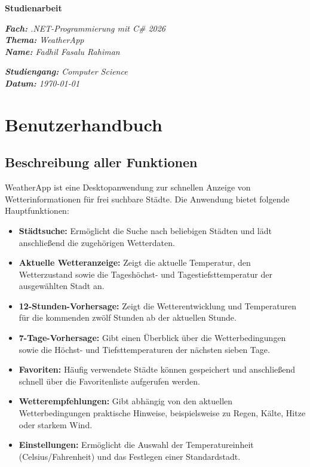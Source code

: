 \documentclass[12pt,a4paper]{article}
\begin{document}
\noindent
{\fontsize{24}{28}\selectfont\bfseries Studienarbeit} \\
\begin{minipage}[t]{0.5\textwidth}
  \vspace{8pt}
  {\itshape \textbf{Fach:} .NET-Programmierung mit C\# 2026} \\
  {\itshape \textbf{Thema:} WeatherApp} \\
  {\itshape \textbf{Name:} Fadhil Fasalu Rahiman}
\end{minipage}
\begin{minipage}[t]{0.5\textwidth}
  \flushright
  \vspace{8pt}
  \itshape \textbf{Studiengang:} Computer Science \\
  \itshape \textbf{Datum:} \today
\end{minipage}

\section{Benutzerhandbuch}

\subsection{Beschreibung aller Funktionen}
WeatherApp ist eine Desktopanwendung zur schnellen Anzeige von
Wetterinformationen für frei suchbare Städte. Die Anwendung bietet
folgende Hauptfunktionen:

\begin{itemize}
  \item \textbf{Städtsuche:} Ermöglicht die Suche nach beliebigen
    Städten und lädt anschließend die zugehörigen Wetterdaten.
  \item \textbf{Aktuelle Wetteranzeige:} Zeigt die aktuelle
    Temperatur, den Wetterzustand sowie die Tageshöchst- und
    Tagestiefsttemperatur der ausgewählten Stadt an.
  \item \textbf{12-Stunden-Vorhersage:} Zeigt die Wetterentwicklung
    und Temperaturen für die kommenden zwölf Stunden ab der aktuellen
    Stunde.
  \item \textbf{7-Tage-Vorhersage:} Gibt einen Überblick über die
    Wetterbedingungen sowie die Höchst- und Tiefsttemperaturen der
    nächsten sieben Tage.
  \item \textbf{Favoriten:} Häufig verwendete Städte können
    gespeichert und anschließend schnell über die Favoritenliste
    aufgerufen werden.
  \item \textbf{Wetterempfehlungen:} Gibt abhängig von den aktuellen
    Wetterbedingungen praktische Hinweise, beispielsweise zu Regen,
    Kälte, Hitze oder starkem Wind.
  \item \textbf{Einstellungen:} Ermöglicht die Auswahl der
    Temperatureinheit (Celsius/Fahrenheit) und das Festlegen einer
    Standardstadt.
\end{itemize}
\end{document}
